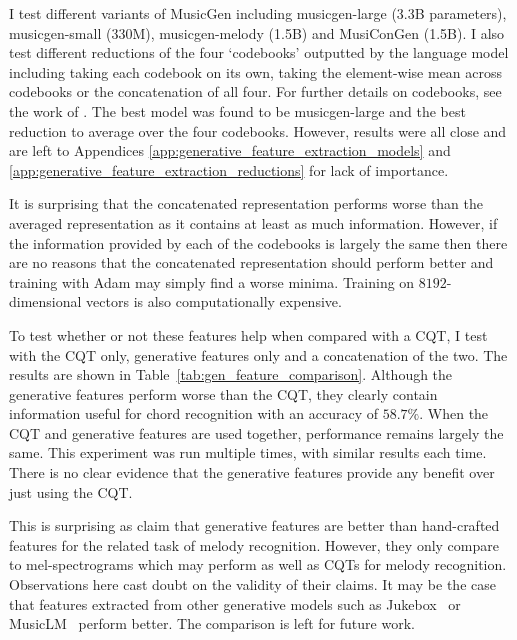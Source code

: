 I test different variants of MusicGen including musicgen-large (3.3B parameters), musicgen-small (330M), musicgen-melody (1.5B) and MusiConGen (1.5B). I also test different reductions of the four `codebooks' outputted by the language model including taking each codebook on its own, taking the element-wise mean across codebooks or the concatenation of all four. For further details on codebooks, see the work of \citet{MusicGen}. The best model was found to be musicgen-large and the best reduction to average over the four codebooks. However, results were all close and are left to Appendices \ref{app:generative_feature_extraction_models} and \ref{app:generative_feature_extraction_reductions} for lack of importance.


It is surprising that the concatenated representation performs worse than the averaged representation as it contains at least as much information. However, if the information provided by each of the codebooks is largely the same then there are no reasons that the concatenated representation should perform better and training with Adam may simply find a worse minima. Training on $8192$-dimensional vectors is also computationally expensive.

To test whether or not these features help when compared with a CQT, I test with the CQT only, generative features only and a concatenation of the two. The results are shown in Table~\ref{tab:gen_feature_comparison}. Although the generative features perform worse than the CQT, they clearly contain information useful for chord recognition with an accuracy of $58.7\%$. When the CQT and generative features are used together, performance remains largely the same. This experiment was run multiple times, with similar results each time. There is no clear evidence that the generative features provide any benefit over just using the CQT. 

This is surprising as \citet{MelodyTranscriptionViaGenerativePreTraining} claim that generative features are better than hand-crafted features for the related task of melody recognition. However, they only compare to mel-spectrograms which may perform as well as CQTs for melody recognition. Observations here cast doubt on the validity of their claims. It may be the case that features extracted from other generative models such as Jukebox~\citep{Jukebox} or MusicLM~\citep{MusicLM} perform better. The comparison is left for future work.


